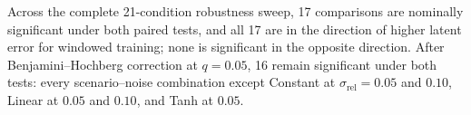 Across the complete 21-condition robustness sweep, 17 comparisons are
nominally significant under both paired tests, and all 17 are in the
direction of higher latent error for windowed training; none is significant
in the opposite direction. After Benjamini--Hochberg correction at $q=0.05$,
16 remain significant under both tests: every scenario--noise combination
except Constant at $\sigma_{\mathrm{rel}}=0.05$ and $0.10$, Linear at
$0.05$ and $0.10$, and Tanh at $0.05$.


%
%


